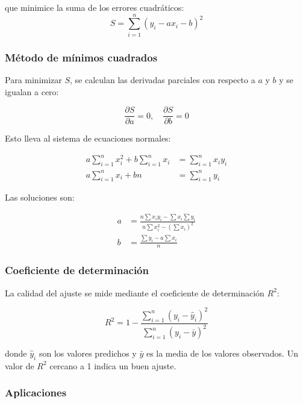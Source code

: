 \documentclass[12pt,a4paper]{article}
\begin{document}
que minimice la suma de los errores cuadráticos:
\begin{equation}
    S = \sum_{i=1}^{n} (y_i - ax_i - b)^2
\end{equation}

\subsubsection{Método de mínimos cuadrados}

Para minimizar $S$, se calculan las derivadas parciales con respecto a $a$ y $b$ y se igualan a cero:

\begin{equation}
    \frac{\partial S}{\partial a} = 0, \quad \frac{\partial S}{\partial b} = 0
\end{equation}

Esto lleva al sistema de ecuaciones normales:

\begin{align}
    a\sum_{i=1}^{n} x_i^2 + b\sum_{i=1}^{n} x_i &= \sum_{i=1}^{n} x_i y_i \\
    a\sum_{i=1}^{n} x_i + bn &= \sum_{i=1}^{n} y_i
\end{align}

Las soluciones son:

\begin{align}
    a &= \frac{n\sum x_i y_i - \sum x_i \sum y_i}{n\sum x_i^2 - (\sum x_i)^2} \\
    b &= \frac{\sum y_i - a\sum x_i}{n}
\end{align}

\subsubsection{Coeficiente de determinación}

La calidad del ajuste se mide mediante el coeficiente de determinación $R^2$:

\begin{equation}
    R^2 = 1 - \frac{\sum_{i=1}^{n}(y_i - \hat{y}_i)^2}{\sum_{i=1}^{n}(y_i - \bar{y})^2}
\end{equation}

donde $\hat{y}_i$ son los valores predichos y $\bar{y}$ es la media de los valores observados. Un valor de $R^2$ cercano a 1 indica un buen ajuste.

\subsubsection{Aplicaciones}
\end{document}
